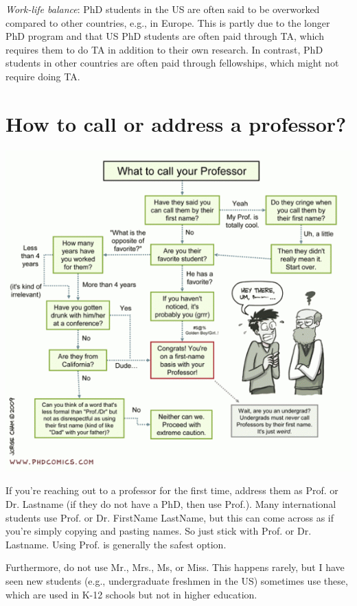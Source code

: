 \documentclass[oneside,11pt,dvipsnames]{book}
\def\sectioninfo#1{%
  \addcontentsline{toc}{sectioninfo}{%
    \noexpand\numberline{}\color{black}{#1}}%
}
\begin{document}
\emph{Work-life balance}: PhD students in the US are often said to be overworked compared to other countries, e.g., in Europe.  This is partly due to the longer PhD program and that US PhD students are often paid through TA, which requires them to do TA in addition to their own research. In contrast, PhD students in other countries are often paid through fellowships, which might not require doing TA.

\section{How to call or address a professor?}\label{sec:address}
\sectioninfo{What should you call your profs.? Many possibilities (e.g., prof., Dr., and even their firstnames), but not Mr. or Mrs.}

\begin{center}
  \includegraphics[scale=0.5]{files/c5.png}
\end{center}

If you're reaching out to a professor for the first time,  address them as Prof. or Dr. Lastname (if they do not have a PhD, then use Prof.). Many international students use Prof. or Dr. FirstName LastName, but this can come across as if you're simply copying and pasting names. So just stick with Prof. or Dr. Lastname.  Using Prof. is generally the safest option.

Furthermore, do not use Mr., Mrs., Ms, or Miss. This happens rarely, but I have seen  new students (e.g., undergraduate freshmen in the US) sometimes use these, which are used in K-12 schools but not in higher education.
\end{document}

